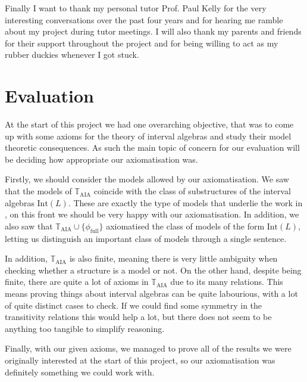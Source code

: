 \documentclass[11pt %
              ]{article}
\newcommand{\theory}{\mathbb{T}}
\newcommand{\taia}{\theory_\text{AIA}}
\newcommand{\inter}[1][-]{\text{Int}\left(#1\right)}
\newcommand{\defformula}[1]{\phi_{#1}}
\newcommand{\allints}{\defformula{\text{full}}}
\theoremstyle{plain}
\theoremstyle{definition}
\theoremstyle{remark}
\begin{document}
Finally I want to thank my personal tutor Prof. Paul Kelly for the very interesting conversations
over the past four years and for hearing me ramble about my project during tutor meetings. I will
also thank my parents and friends for their support throughout the project and for being willing
to act as my rubber duckies whenever I got stuck.
\vfill
\hspace{0pt}

\newpage
\tableofcontents

\newpage
\pagestyle{fancy}
\fancyhf{}
\lhead{\nouppercase{\leftmark}}
\fancyfoot[C]{\thepage}
\setlength{\headheight}{13.59999pt}
\addtolength{\topmargin}{-1.59999pt}




\newpage


\newpage


\newpage
\section{Evaluation}

At the start of this project we had one overarching objective, that was to come up with some axioms
for the theory of interval algebras and study their model theoretic consequences.
As such the main topic of concern for our evaluation will be deciding how appropriate our
axiomatisation was.

Firstly, we should consider the models allowed by our axiomatisation. We saw that the models of
$\taia$ coincide with the class of substructures of the interval algebras $\inter[L]$.
These are exactly the type of models that underlie the work in \cite{allen83}, on this front
we should be very happy with our axiomatisation. In addition, we also saw that
$\taia \cup \{\allints\}$ axiomatised the class of models of the form $\inter[L]$, letting us
distinguish an important class of models through a single sentence.

In addition, $\taia$ is also finite, meaning there is very little ambiguity when checking
whether a structure is a model or not. On the other hand, despite being finite, there are quite
a lot of axioms in $\taia$ due to its many relations. This means proving things about
interval algebras can be quite labourious, with a lot of quite distinct cases to check. If we could
find some symmetry in the transitivity relations this would help a lot, but there does not seem
to be anything too tangible to simplify reasoning.

Finally, with our given axioms, we managed to prove all of the results we were originally
interested at the start of this project, so our axiomatisation was definitely something we could
work with.

\newpage


\newpage


\end{document}
